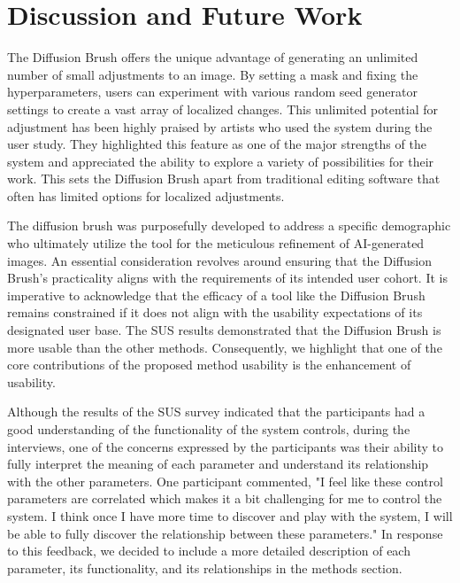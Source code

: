\documentclass[10pt,twocolumn,letterpaper]{article}
\begin{document}
\section{Discussion and Future Work}
The Diffusion Brush offers the unique advantage of generating an unlimited number of small adjustments to an image. By setting a mask and fixing the hyperparameters, users can experiment with various random seed generator settings to create a vast array of localized changes. This unlimited potential for adjustment has been highly praised by artists who used the system during the user study. They highlighted this feature as one of the major strengths of the system and appreciated the ability to explore a variety of possibilities for their work. This sets the Diffusion Brush apart from traditional editing software that often has limited options for localized adjustments.

 The diffusion brush was purposefully developed to address a specific demographic who ultimately utilize the tool for the meticulous refinement of AI-generated images. An essential consideration revolves around ensuring that the Diffusion Brush's practicality aligns with the requirements of its intended user cohort. It is imperative to acknowledge that the efficacy of a tool like the Diffusion Brush remains constrained if it does not align with the usability expectations of its designated user base. The SUS results demonstrated that the Diffusion Brush is more usable than the other methods. Consequently, we highlight that one of the core contributions of the proposed method usability is the enhancement of usability.

Although the results of the SUS survey indicated that the participants had a good understanding of the functionality of the system controls, during the interviews, one of the concerns expressed by the participants was their ability to fully interpret the meaning of each parameter and understand its relationship with the other parameters. One participant commented, "I feel like these control parameters are correlated which makes it a bit challenging for me to control the system. I think once I have more time to discover and play with the system, I will be able to fully discover the relationship between these parameters." In response to this feedback, we decided to include a more detailed description of each parameter, its functionality, and its relationships in the methods section.
\end{document}
